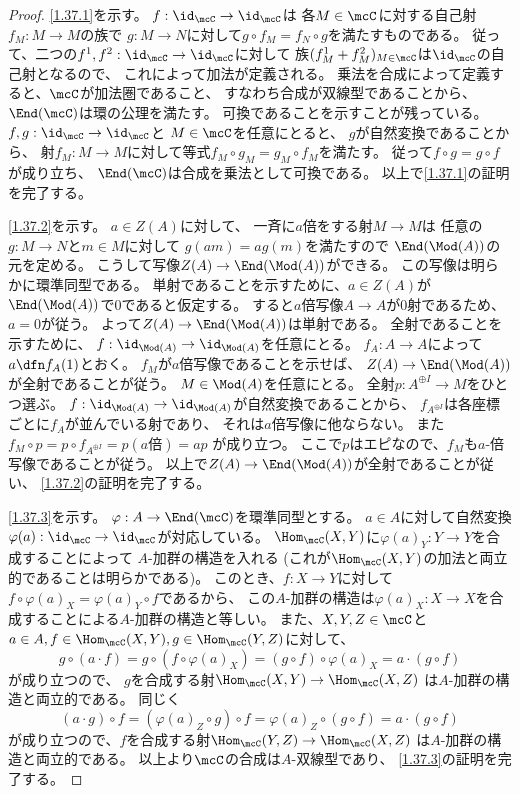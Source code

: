 \documentclass[uplatex,dvipdfmx]{jsarticle}
\begin{document}
\begin{proof}
  \ref{1.37.1}を示す。
  \(f:\id_{\mcC}\to \id_{\mcC}\)は
  各\(M\in \mcC\)に対する自己射\(f_M:M\to M\)の族で
  \(g:M\to N\)に対して\(g\circ f_M = f_N\circ g\)を満たすものである。
  従って、二つの\(f^1,f^2:\id_{\mcC}\to \id_{\mcC}\)に対して
  族\((f^1_M+f^2_M)_{M\in \mcC}\)は\(\id_{\mcC}\)の自己射となるので、
  これによって加法が定義される。
  乗法を合成によって定義すると、\(\mcC\)が加法圏であること、
  すなわち合成が双線型であることから、\(\End(\mcC)\)は環の公理を満たす。
  可換であることを示すことが残っている。
  \(f,g:\id_{\mcC}\to \id_{\mcC}\)と
  \(M\in \mcC\)を任意にとると、
  \(g\)が自然変換であることから、
  射\(f_M:M\to M\)に対して等式\(f_M\circ g_M = g_M\circ f_M\)を満たす。
  従って\(f\circ g = g\circ f\)が成り立ち、
  \(\End(\mcC)\)は合成を乗法として可換である。
  以上で\ref{1.37.1}の証明を完了する。

  \ref{1.37.2}を示す。
  \(a\in Z(A)\)に対して、
  一斉に\(a\)倍をする射\(M\to M\)は
  任意の\(g:M\to N\)と\(m\in M\)に対して
  \(g(am) = ag(m)\)を満たすので
  \(\End(\Mod(A))\)の元を定める。
  こうして写像\(Z(A)\to \End(\Mod(A))\)ができる。
  この写像は明らかに環準同型である。
  単射であることを示すために、\(a\in Z(A)\)が\(\End(\Mod(A))\)で\(0\)であると仮定する。
  すると\(a\)倍写像\(A\to A\)が\(0\)射であるため、\(a=0\)が従う。
  よって\(Z(A)\to \End(\Mod(A))\)は単射である。
  全射であることを示すために、
  \(f:\id_{\Mod(A)}\to \id_{\Mod(A)}\)を任意にとる。
  \(f_A:A\to A\)によって\(a\dfn f_A(1)\)とおく。
  \(f_M\)が\(a\)倍写像であることを示せば、
  \(Z(A)\to \End(\Mod(A))\)が全射であることが従う。
  \(M\in \Mod(A)\)を任意にとる。
  全射\(p:A^{\oplus I}\to M\)をひとつ選ぶ。
  \(f:\id_{\Mod(A)}\to \id_{\Mod(A)}\)が自然変換であることから、
  \(f_{A^{\oplus I}}\)は各座標ごとに\(f_A\)が並んでいる射であり、
  それは\(a\)倍写像に他ならない。
  また\(f_M\circ p = p\circ f_{A^{\oplus I}} = p(a\text{倍}) = ap\)
  が成り立つ。
  ここで\(p\)はエピなので、\(f_M\)も\(a\)-倍写像であることが従う。
  以上で\(Z(A)\to \End(\Mod(A))\)が全射であることが従い、
  \ref{1.37.2}の証明を完了する。

  \ref{1.37.3}を示す。
  \(\varphi:A\to \End(\mcC)\)を環準同型とする。
  \(a\in A\)に対して自然変換\(\varphi(a):\id_{\mcC}\to \id_{\mcC}\)が対応している。
  \(\Hom_{\mcC}(X,Y)\)に\(\varphi(a)_Y:Y\to Y\)を合成することによって
  \(A\)-加群の構造を入れる
  (これが\(\Hom_{\mcC}(X,Y)\)の加法と両立的であることは明らかである)。
  このとき、\(f:X\to Y\)に対して
  \(f\circ \varphi(a)_X = \varphi(a)_Y\circ f\)であるから、
  この\(A\)-加群の構造は\(\varphi(a)_X:X\to X\)を合成することによる\(A\)-加群の構造と等しい。
  また、\(X,Y,Z\in \mcC\)と
  \(a\in A, f\in \Hom_{\mcC}(X,Y), g\in \Hom_{\mcC}(Y,Z)\)に対して、
  \[
  g\circ (a\cdot f) = g\circ (f\circ \varphi(a)_X)
  = (g\circ f)\circ \varphi(a)_X = a\cdot (g\circ f)
  \]
  が成り立つので、
  \(g\)を合成する射\(\Hom_{\mcC}(X,Y) \to \Hom_{\mcC}(X,Z)\)
  は\(A\)-加群の構造と両立的である。
  同じく
  \[
  (a\cdot g)\circ f = (\varphi(a)_Z\circ g) \circ f
  = \varphi(a)_Z\circ (g\circ f) = a\cdot (g\circ f)
  \]
  が成り立つので、\(f\)を合成する射\(\Hom_{\mcC}(Y,Z) \to \Hom_{\mcC}(X,Z)\)
  は\(A\)-加群の構造と両立的である。
  以上より\(\mcC\)の合成は\(A\)-双線型であり、
  \ref{1.37.3}の証明を完了する。


\end{proof}
\end{document}
